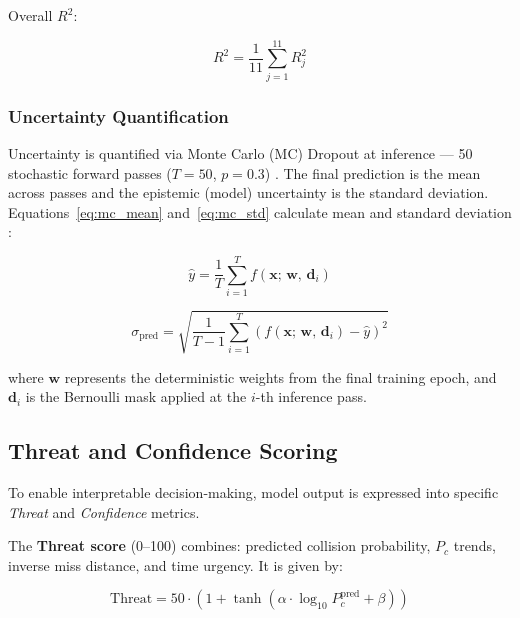 \documentclass[12pt, a4paper]{article}
\begin{document}
Overall $R^2$:

\begin{equation}
    R^2 = \frac{1}{11} \sum_{j=1}^{11} R_j^2
    \label{eq:r2_overall}
\end{equation}

\subsubsection{Uncertainty Quantification}

Uncertainty is quantified via Monte Carlo (MC) Dropout at inference — 50 stochastic forward passes ($T = 50$, $p = 0.3$) \cite{ref7}. The final prediction is the mean across passes and the epistemic (model) uncertainty is the standard deviation. Equations~\eqref{eq:mc_mean} and~\eqref{eq:mc_std} calculate mean and standard deviation \cite{ref8, ref9, ref10}:

\begin{equation}
    \hat{y} = \frac{1}{T} \sum_{i=1}^{T} f\!\left(\mathbf{x};\, \bm{w},\, \mathbf{d}_i\right)
    \label{eq:mc_mean}
\end{equation}

\begin{equation}
    \sigma_{\text{pred}} = \sqrt{\frac{1}{T-1} \sum_{i=1}^{T} \left(f\!\left(\mathbf{x};\, \bm{w},\, \mathbf{d}_i\right) - \hat{y}\right)^2}
    \label{eq:mc_std}
\end{equation}

\noindent where $\bm{w}$ represents the deterministic weights from the final training epoch, and $\mathbf{d}_i$ is the Bernoulli mask applied at the $i$-th inference pass.

\subsection{Threat and Confidence Scoring}

To enable interpretable decision-making, model output is expressed into specific \textit{Threat} and \textit{Confidence} metrics.

The \textbf{Threat score} (0--100) combines: predicted collision probability, $P_c$ trends, inverse miss distance, and time urgency. It is given by:

\begin{equation}
    \text{Threat} = 50 \cdot \left(1 + \tanh\!\left(\alpha \cdot \log_{10} P_c^{\text{pred}} + \beta\right)\right)
    \label{eq:threat}
\end{equation}
\end{document}
